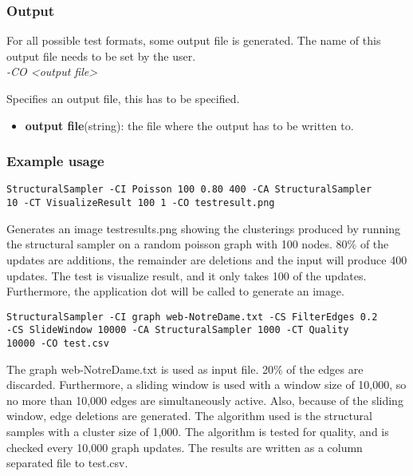 \documentclass[a4paper]{article}
\begin{document}
\subsubsection{Output}
For all possible test formats, some output file is generated. The name of this output file needs to be set by the user. \\


\emph{-CO <output file>}

Specifies an output file, this has to be specified. \\
\begin{itemize}
	\item \textbf{output file}(string): the file where the output has to be written to.
\end{itemize}

\subsubsection{Example usage}\label{sec:eu}
\begin{verbatim}
StructuralSampler -CI Poisson 100 0.80 400 -CA StructuralSampler 
10 -CT VisualizeResult 100 1 -CO testresult.png
\end{verbatim}

Generates an image testresults.png showing the clusterings produced by running the structural sampler on a random poisson graph with 100 nodes. 80\% of the updates are additions, the remainder are deletions and the input will produce 400 updates. The test is visualize result, and it only takes 100 of the updates. Furthermore, the application dot will be called to generate an image.

\begin{verbatim}
StructuralSampler -CI graph web-NotreDame.txt -CS FilterEdges 0.2 
-CS SlideWindow 10000 -CA StructuralSampler 1000 -CT Quality 
10000 -CO test.csv
\end{verbatim}

The graph web-NotreDame.txt is used as input file. 20\% of the edges are discarded. Furthermore, a sliding window is used with a window size of 10,000, so no more than 10,000 edges are simultaneously active. Also, because of the sliding window, edge deletions are generated. The algorithm used is the structural samples with a cluster size of 1,000. The algorithm is tested for quality, and is checked every 10,000 graph updates. The results are written as a column separated file to test.csv.
\end{document}
